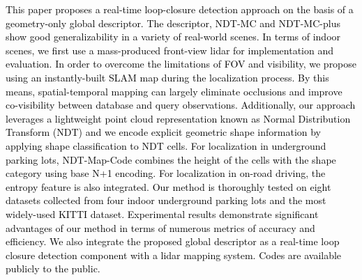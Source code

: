 \documentclass[letterpaper, 10 pt, conference]{ieeeconf}   %
\newcommand\kevin[1]{\textcolor{black}{#1}}
\begin{document}
\kevin{This paper proposes a real-time loop-closure detection approach on the basis of a geometry-only global descriptor. The descriptor, NDT-MC and NDT-MC-plus show good generalizability in a variety of real-world scenes. In terms of indoor scenes, we first use a mass-produced front-view lidar for implementation and evaluation. In order to overcome the limitations of FOV and visibility, we propose using an instantly-built SLAM map during the localization process. By this means, spatial-temporal mapping can largely eliminate occlusions and improve co-visibility between database and query observations. Additionally, our approach leverages a lightweight point cloud representation known as Normal Distribution Transform (NDT) and we encode explicit geometric shape information by applying shape classification to NDT cells. }
\kevin{For localization in underground parking lots, NDT-Map-Code combines the height of the cells with the shape category using base N+1 encoding. For localization in on-road driving, the entropy feature is also integrated. Our method is thoroughly tested on eight datasets collected from four indoor underground parking lots and the most widely-used KITTI dataset. Experimental results demonstrate significant advantages of our method in terms of numerous metrics of accuracy and efficiency. We also integrate the proposed global descriptor as a real-time loop closure detection component with a lidar mapping system. Codes are available publicly to the public.}
\end{document}

